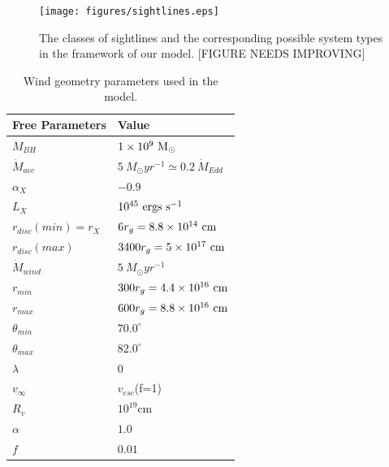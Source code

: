 \documentclass[preprint, a4paper, 11pt]{aastex}
\begin{document}
\begin{figure}
\centering
\texttt{[image: figures/sightlines.eps]}
\caption
{
The classes of sightlines and the corresponding possible 
system types in the framework of our model.
[FIGURE NEEDS IMPROVING]
}
\label{fig:lobal}
\end{figure}




\begin{table}
\begin{tabular}{p{3cm}p{4cm}}
\hline Free Parameters 	&	 Value \\ 
\hline \hline 
$M_{BH}$ 	 &	 $1\times 10^9~\rm{M_{\odot}}$ \\ 
$\dot{M}_{acc}$ 	 &	 $5~M_{\odot}yr^{-1} \simeq 0.2~\dot{M}_{Edd}$\\ 
$\alpha_X$ 	 &	 $-0.9$ \\ 
$L_{X} $ 	 &	 $10^{45}~\rm{ergs~s^{-1}}$\\ 
$r_{disc}(min)=r_{X}$   &	 $6r_g=8.8\times10^{14}~{\rm cm}$ \\ 
$r_{disc}(max)$   &	 $3400r_g = 5\times10^{17}~{\rm cm}$ \\ 
$\dot{M}_{wind}$  &	 $5~M_{\odot}yr^{-1}$ \\ 
$r_{min}$ 	&	 $300r_{g} = 4.4\times10^{16}~{\rm cm}$\\ 
$r_{max}$ 	&	 $600r_{g} = 8.8\times10^{16}~{\rm cm}$ \\ 
$\theta_{min}$ 	&	 $70.0^{\circ}$ \\ 
$\theta_{max}$ 	&	 $82.0^{\circ}$ \\ 
$\lambda$ 	&	 $0$ \\ 
$v_{\infty}$ 	&	 $v_{esc}$(f=1) \\ 
$R_v$ 	        &	 $10^{19}$cm \\ 
$\alpha$ 	&	 $1.0$ \\
$f$ 	&	 $0.01$ \\
\hline 
\end{tabular}
\caption{Wind geometry parameters used in the model.}
\label{wind_param}
\end{table}
\end{document}
